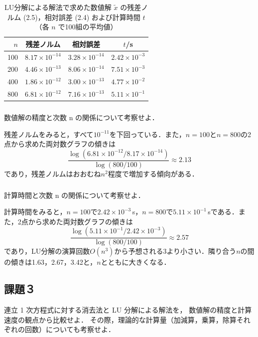 \documentclass{jarticle}
\begin{document}
\begin{table}[htbp]
    \centering
    \caption{LU分解による解法で求めた数値解 $\tilde{x}$ の残差ノルム (2.5)，相対誤差 (2.4) および計算時間 $t$（各 $n$ で100組の平均値）}
    \label{tab:work2}
    \begin{tabular}{rccc}
        \hline
        $n$ & 残差ノルム & 相対誤差 & $t$/s \\
        \hline
        100 & $8.17\times10^{-14}$ & $3.28\times10^{-14}$ & $2.42\times10^{-3}$ \\
        200 & $4.46\times10^{-13}$ & $8.06\times10^{-14}$ & $7.51\times10^{-3}$ \\
        400 & $1.86\times10^{-12}$ & $3.00\times10^{-13}$ & $4.77\times10^{-2}$ \\
        800 & $6.81\times10^{-12}$ & $7.16\times10^{-13}$ & $5.11\times10^{-1}$ \\
        \hline
    \end{tabular}
\end{table}

\subsubsection{}
数値解の精度と次数 n の関係について考察せよ．

残差ノルムをみると，すべて$10^{-11}$を下回っている．また，$n=100$と$n=800$の2点から求めた両対数グラフの傾きは
\[
    \frac{\log(6.81\times10^{-12}/8.17\times10^{-14})}{\log(800/100)} \approx 2.13
\]
であり，残差ノルムはおおむね$n^2$程度で増加する傾向がある．
\subsubsection{}
計算時間と次数 n の関係について考察せよ．

計算時間をみると，$n=100$で$2.42\times10^{-3}$\,s，$n=800$で$5.11\times10^{-1}$\,sである．また，2点から求めた両対数グラフの傾きは
\[
    \frac{\log(5.11\times10^{-1}/2.42\times10^{-3})}{\log(800/100)} \approx 2.57
\]
であり，LU分解の演算回数$O(n^3)$から予想される3より小さい．隣り合う$n$の間の傾きは1.63，2.67，3.42と，$n$とともに大きくなる．

\clearpage
\subsection{課題３}
連立 1 次方程式に対する消去法と LU 分解による解法を，
数値解の精度と計算速度の観点から比較せよ．
その際，理論的な計算量（加減算，乗算，除算それぞれの回数）についても考察せよ．
\end{document}
